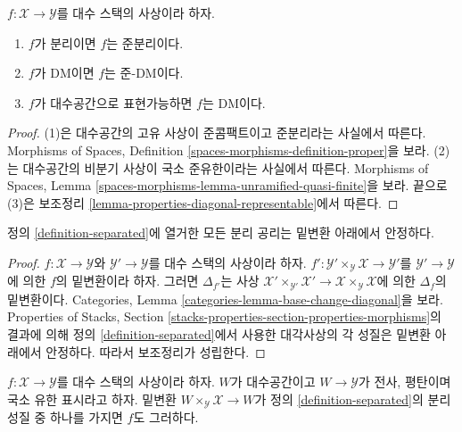 \begin{lemma}
\label{lemma-trivial-implications}
$f : \mathcal{X} \to \mathcal{Y}$를 대수 스택의 사상이라 하자.
\begin{enumerate}
\item $f$가 분리이면 $f$는 준분리이다.
\item $f$가 DM이면 $f$는 준-DM이다.
\item $f$가 대수공간으로 표현가능하면 $f$는 DM이다.
\end{enumerate}
\end{lemma}

\begin{proof}
(1)은 대수공간의 고유 사상이 준콤팩트이고 준분리라는 사실에서 따른다.
Morphisms of Spaces, Definition
\ref{spaces-morphisms-definition-proper}을 보라.
(2)는 대수공간의 비분기 사상이 국소 준유한이라는 사실에서 따른다.
Morphisms of Spaces, Lemma
\ref{spaces-morphisms-lemma-unramified-quasi-finite}을 보라.
끝으로 (3)은 보조정리 \ref{lemma-properties-diagonal-representable}에서
따른다.
\end{proof}

\begin{lemma}
\label{lemma-base-change-separated}
정의 \ref{definition-separated}에 열거한 모든 분리 공리는
밑변환 아래에서 안정하다.
\end{lemma}

\begin{proof}
$f : \mathcal{X} \to \mathcal{Y}$와
$\mathcal{Y}' \to \mathcal{Y}$를 대수 스택의 사상이라 하자.
$f' : \mathcal{Y}' \times_\mathcal{Y} \mathcal{X} \to \mathcal{Y}'$를
$\mathcal{Y}' \to \mathcal{Y}$에 의한 $f$의 밑변환이라 하자.
그러면 $\Delta_{f'}$는 사상
$\mathcal{X}' \times_{\mathcal{Y}'} \mathcal{X}' \to
\mathcal{X} \times_\mathcal{Y} \mathcal{X}$에 의한
$\Delta_f$의 밑변환이다. Categories, Lemma
\ref{categories-lemma-base-change-diagonal}을 보라.
Properties of Stacks, Section
\ref{stacks-properties-section-properties-morphisms}의 결과에 의해
정의 \ref{definition-separated}에서 사용한 대각사상의 각 성질은
밑변환 아래에서 안정하다. 따라서 보조정리가 성립한다.
\end{proof}

\begin{lemma}
\label{lemma-check-separated-covering}
$f : \mathcal{X} \to \mathcal{Y}$를 대수 스택의 사상이라 하자.
$W$가 대수공간이고 $W \to \mathcal{Y}$가 전사, 평탄이며
국소 유한 표시라고 하자. 밑변환
$W \times_\mathcal{Y} \mathcal{X} \to W$가 정의
\ref{definition-separated}의 분리 성질 중 하나를 가지면 $f$도 그러하다.
\end{lemma}


